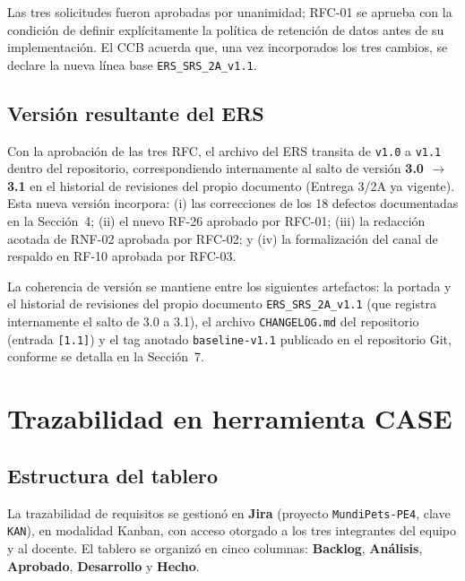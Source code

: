 \documentclass[journal,onecolumn]{IEEEtran}
\begin{document}
Las tres solicitudes fueron aprobadas por unanimidad; RFC-01 se aprueba con la condición de definir explícitamente la política de retención de datos antes de su implementación. El CCB acuerda que, una vez incorporados los tres cambios, se declare la nueva línea base \texttt{ERS\_SRS\_2A\_v1.1}.

\subsection{Versión resultante del ERS}

Con la aprobación de las tres RFC, el archivo del ERS transita de \texttt{v1.0} a \texttt{v1.1} dentro del repositorio, correspondiendo internamente al salto de versión \textbf{3.0 $\rightarrow$ 3.1} en el historial de revisiones del propio documento (Entrega 3/2A ya vigente). Esta nueva versión incorpora: (i) las correcciones de los 18 defectos documentadas en la Sección~4; (ii) el nuevo RF-26 aprobado por RFC-01; (iii) la redacción acotada de RNF-02 aprobada por RFC-02; y (iv) la formalización del canal de respaldo en RF-10 aprobada por RFC-03.

La coherencia de versión se mantiene entre los siguientes artefactos: la portada y el historial de revisiones del propio documento \texttt{ERS\_SRS\_2A\_v1.1} (que registra internamente el salto de 3.0 a 3.1), el archivo \texttt{CHANGELOG.md} del repositorio (entrada \texttt{[1.1]}) y el tag anotado \texttt{baseline-v1.1} publicado en el repositorio Git, conforme se detalla en la Sección~7.
	\section{Trazabilidad en herramienta CASE} \label{sec:trazabilidad_case}
	
	\subsection{Estructura del tablero}
	
	La trazabilidad de requisitos se gestionó en \textbf{Jira} (proyecto \texttt{MundiPets-PE4}, clave \texttt{KAN}), en modalidad Kanban, con acceso otorgado a los tres integrantes del equipo y al docente. El tablero se organizó en cinco columnas: \textbf{Backlog}, \textbf{Análisis}, \textbf{Aprobado}, \textbf{Desarrollo} y \textbf{Hecho}.
	
\end{document}

